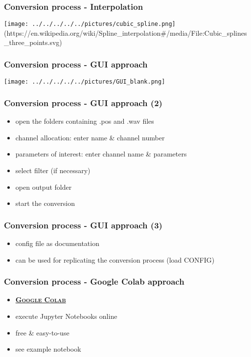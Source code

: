 \documentclass[12pt,a4paper]{beamer}
\begin{document}
\begin{frame}
    \frametitle{Conversion process - Interpolation}
    \centering
    \texttt{[image: ../../../../../pictures/cubic\_spline.png]}\\
    {\scriptsize (https://en.wikipedia.org/wiki/Spline\_interpolation#/media/File:Cubic\_splines\_three\_points.svg)}
\end{frame}

\begin{frame}
    \frametitle{Conversion process - GUI approach}
    \centering
    \texttt{[image: ../../../../../pictures/GUI\_blank.png]}
\end{frame}

\begin{frame}
    \frametitle{Conversion process - GUI approach (2)}
    \begin{itemize}
        \item open the folders containing .pos and .wav files
        \item channel allocation: enter name & channel number
        \item parameters of interest: enter channel name & parameters
        \item select filter (if necessary)
        \item open output folder
        \item start the conversion
    \end{itemize}
\end{frame}

\begin{frame}
    \frametitle{Conversion process - GUI approach (3)}
    \begin{itemize}
        \item config file as documentation
        \item can be used for replicating the conversion process (load CONFIG)
    \end{itemize}
\end{frame}

\begin{frame}
    \frametitle{Conversion process - Google Colab approach}
    \begin{itemize}
        \item \href{colab.research.google.com}{\textbf{\textsc{Google Colab}}}
        \item execute Jupyter Notebooks  online
        \item free & easy-to-use
        \item see example notebook
    \end{itemize}
\end{frame}
\end{document}
